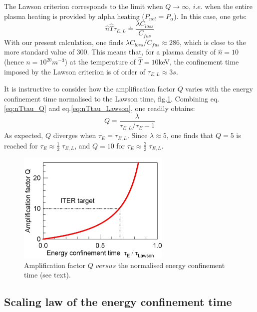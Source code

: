 The Lawson criterion corresponds to the limit when $Q\to\infty$, $i.e.$ when the entire plasma heating is provided by alpha heating ($P_{net}=P_\alpha$). In this case, one gets:
\begin{equation}
  \hat n \hat T \tau_{E,L} \doteq \frac{\lambda C_{loss}}{C_{fus}}
\label{eq:nTtau_Lawson}
\end{equation}
With our present calculation, one finds $\lambda C_{loss}/C_{fus} \approx 286$, which is close to the more standard value of 300. This means that, for a plasma density of $\hat n=10$ (hence $n=10^{20}\si{m^{-3}}$) at the temperature of $\hat T=10$keV, the confinement time imposed by the Lawson criterion is of order of $\tau_{E,L} \approx 3s$.

It is instructive to consider how the amplification factor $Q$ varies with the energy confinement time normalised to the Lawson time, fig.\ref{fig:Q_tauE}. Combining eq.\ref{eq:nTtau_Q} and eq.\ref{eq:nTtau_Lawson}, one readily obtains:
\begin{equation}
    Q = \frac{\lambda}{\tau_{E,L}/\tau_E - 1}
\end{equation}
As expected, $Q$ diverges when $\tau_E = \tau_{E,L}$. Since $\lambda \approx 5$, one finds that $Q=5$ is reached for $\tau_E \approx \frac{1}{2}\; \tau_{E,L}$, and $Q=10$ for $\tau_E \approx \frac{2}{3}\; \tau_{E,L}$.

\begin{figure} 
	\begin{center}
		\includegraphics[width=0.65\textwidth]{figures/Graph_Qfactor_tauE.png}
		\caption{Amplification factor $Q$ $versus$ the normalised energy confinement time (see text).}
		\label{fig:Q_tauE}
	\end{center}
\end{figure}


\subsection{Scaling law of the energy confinement time}
\label{sec:scaling_law}

